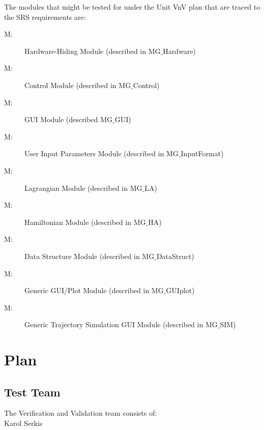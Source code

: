 \documentclass[12pt, titlepage]{article}
\newcounter{mnum}
\newcommand{\mthemnum}{M\themnum}
\begin{document}
The modules that might be tested for under the Unit VnV plan that are traced to the SRS requirements are:
\begin{description}
\item [ \mthemnum \label{mHH}:] Hardware-Hiding Module (described in MG$\_$Hardware)
\item [ \mthemnum \label{mHH}:] \progname Control Module (described in MG$\_$Control)
\item [ \mthemnum \label{mHH}:] \progname GUI Module (described MG$\_$GUI)
\item [ \mthemnum \label{mHH}:] User Input Parameters Module (described in MG$\_$InputFormat)
\item [ \mthemnum \label{mHH}:] Lagrangian Module (described in MG$\_$LA)
\item [ \mthemnum \label{mHH}:] Hamiltonian Module (described in MG$\_$HA)
\item [ \mthemnum \label{mHH}:] Data Structure Module (described in MG$\_$DataStruct)
\item [ \mthemnum \label{mHH}:] Generic GUI/Plot Module (described in MG$\_$GUIplot)
\item [ \mthemnum \label{mHH}:] Generic Trajectory Simulation GUI Module (described in MG$\_$SIM)
\end{description}


\section{Plan}
	

\subsection{Test Team}

The Verification and Validation team consists of:\\
Karol Serkis
\end{document}
